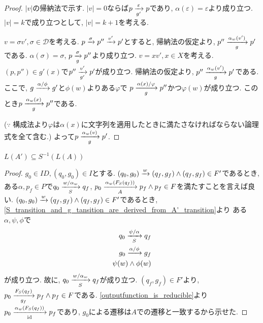 \documentclass[uplatex,dvipdfmx,a4j]{jsreport}
\begin{document}
  \begin{proof}
    $|v|$の帰納法で示す.
    $|v| = 0$ならば$p \transarrow{\varepsilon}{g'} p$であり,
    $\alpha(\varepsilon) = \varepsilon$より成り立つ.
    $|v| = k$で成り立つとして, $|v| = k + 1$を考える.

    $v = \sigma v', \sigma \in \mathcal{D}$を考える.
    $p \transarrow{\sigma}{} p'' \transarrow{v'}{} p'$とすると,
    帰納法の仮定より, $p'' \transarrow{\alpha_w(v')}{g} p'$である.
    $\alpha(\sigma) = \sigma$, $p \transarrow{\sigma}{g} p''$より成り立つ.
    $v = x v', x \in X$を考える.
    $(p, p'') \in g'(x)$で$p'' \transarrow{v'}{g'} p'$が成り立つ.
    帰納法の仮定より, $p'' \transarrow{\alpha_w(v')}{g} p'$である.
    ここで, $g \transarrow{\alpha / \phi}{} g'$と$\phi(w)$よりある$\varphi$で
    $p \transarrow{\alpha(x) / \varphi}{g} p''$かつ$\varphi(w)$が成り立つ.
    このとき$p \transarrow{\alpha_w(x)}{g} p''$である.

    ($\because$
    構成法より$\varphi$は$\alpha(x)$に文字列を適用したときに満たさなければならない論理式を全て含む.)
    よって$p \transarrow{\alpha_w(v)}{g} p'$.
  \end{proof}

  \begin{theorem} \label{symbolic_soundness}
    $L(A') \subseteq S^{-1}(L(A))$
  \end{theorem}

  \begin{proof}
    $g_0 \in ID, (q_0, g_0) \in I$とする.
    $(q_0, g_0) \transarrow{w}{} (q_f, g_f) \land (q_f, g_f) \in F'$であるとき,
    ある$\alpha, p_f \in P$で$q_0 \transarrow{w / \alpha_w}{S} q_f$,
    $p_0 \transarrow{\alpha_w(F_S(q_f))}{A} p_f \land p_f \in F$を満たすことを言えば良い.
    $(q_0, g_0) \transarrow{w}{} (q_f, g_f) \land (q_f, g_f) \in F'$であるとき,
    \ref{S_transition_and_g_tansition_are_derived_from_A'_transition}より
    ある$\alpha, \psi, \phi$で
    \begin{align*}
      q_0 \transarrow{\psi / \alpha}{S} q_f \\
      g_0 \transarrow{\alpha / \phi}{} g_f \\
      \psi(w) \land \phi(w)
    \end{align*}
    が成り立つ.
    故に, $q_0 \transarrow{w / \alpha_w}{S} q_f$が成り立つ.
    $(q_f, g_f) \in F'$より,
    $p_0 \transarrow{F_S(q_f)}{g_f} p_f \land p_f \in F$である.
    \ref{outputfunction_is_reducible}より
    $p_0 \transarrow{\alpha_w(F_S(q_f))}{\scriptsize \id} p_f$であり,
    $g_0$による遷移は$A$での遷移と一致するから示せた.
  \end{proof}
\end{document}
